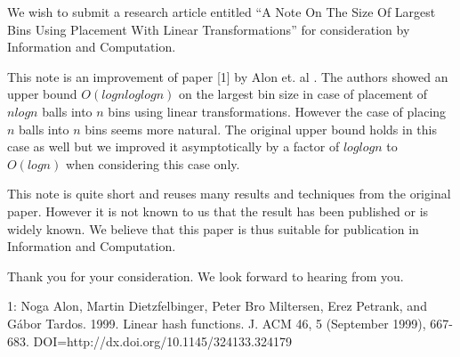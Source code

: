 \documentclass[10pt,stdletter]{newlfm}
\begin{document}
\begin{newlfm}
We wish to submit a research article entitled ``A Note On The Size Of Largest Bins Using Placement With Linear Transformations'' for consideration by Information and Computation. 

This note is an improvement of paper [1] by Alon et. al . The authors showed an upper bound $O(log n log log n)$ on the largest bin size in case of placement of $n log n$ balls into $n$ bins using linear transformations.
However the case of placing $n$ balls into $n$ bins seems more natural.
The original upper bound holds in this case as well but we improved it asymptotically by a factor of $log log n$ to $O(log n)$ when considering this case only.

This note is quite short and reuses many results and techniques from the original paper. However it is not known to us that the result has been published or is widely known.
We believe that this paper is thus suitable for publication in Information and Computation. 

Thank you for your consideration. 
We look forward to hearing from you.

1: Noga Alon, Martin Dietzfelbinger, Peter Bro Miltersen, Erez Petrank, and Gábor Tardos. 1999. Linear hash functions. J. ACM 46, 5 (September 1999), 667-683. DOI=http://dx.doi.org/10.1145/324133.324179
\end{newlfm}
\end{document}

